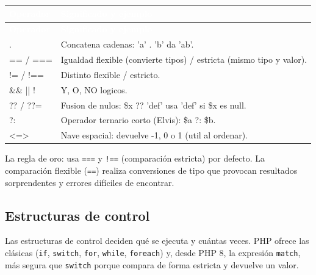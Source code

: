 \documentclass[11pt]{article}
\begin{document}
{\renewcommand{\arraystretch}{1.25}
\begin{longtable}{>{\raggedright\arraybackslash}p{2.6cm} >{\raggedright\arraybackslash}p{12.8cm}}
\rowcolor{phpazul}\textcolor{white}{\textbf{Operador}} & \textcolor{white}{\textbf{Significado y ejemplo}} \\
\endfirsthead
\rowcolor{phpazul}\textcolor{white}{\textbf{Operador}} & \textcolor{white}{\textbf{Significado y ejemplo}} \\
\endhead
\ttfamily\color{phpazul}. & Concatena cadenas: 'a' . 'b' da 'ab'. \\ \hline
\ttfamily\color{phpazul}== / === & Igualdad flexible (convierte tipos) / estricta (mismo tipo y valor). \\ \hline
\ttfamily\color{phpazul}!= / !== & Distinto flexible / estricto. \\ \hline
\ttfamily\color{phpazul}\&\& || ! & Y, O, NO logicos. \\ \hline
\ttfamily\color{phpazul}?? / ??= & Fusion de nulos: \$x ?? 'def' usa 'def' si \$x es null. \\ \hline
\ttfamily\color{phpazul}?: & Operador ternario corto (Elvis): \$a ?: \$b. \\ \hline
\ttfamily\color{phpazul}\textless{}=\textgreater{} & Nave espacial: devuelve -1, 0 o 1 (util al ordenar). \\ \hline
\end{longtable}}
La regla de oro: usa \texttt{=\allowbreak{}=\allowbreak{}=\allowbreak{}} y \texttt{!=\allowbreak{}=\allowbreak{}} (comparación estricta) por defecto. La comparación flexible (\texttt{=\allowbreak{}=\allowbreak{}}) realiza conversiones de tipo que provocan resultados sorprendentes y errores difíciles de encontrar.

\subsection{Estructuras de control}
Las estructuras de control deciden qué se ejecuta y cuántas veces. PHP ofrece las clásicas (\texttt{if}, \texttt{switch}, \texttt{for}, \texttt{while}, \texttt{foreach}) y, desde PHP 8, la expresión \texttt{match}, más segura que \texttt{switch} porque compara de forma estricta y devuelve un valor.
\end{document}
